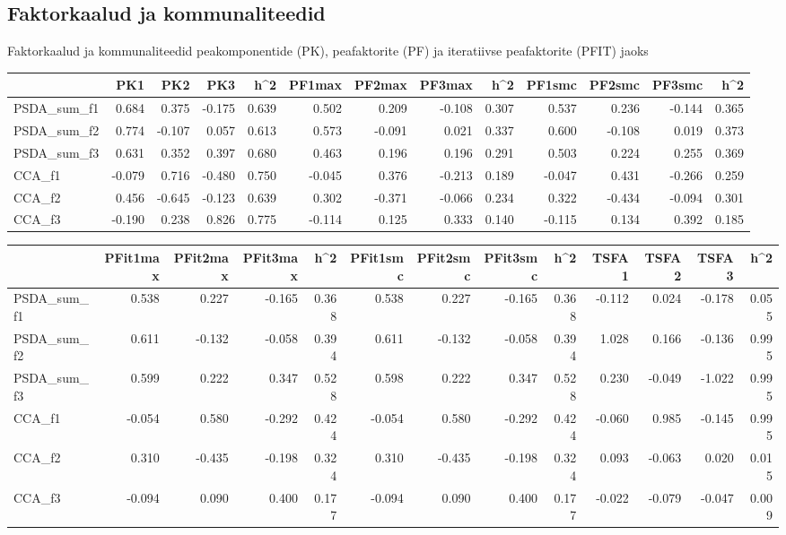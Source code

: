 \documentclass[a4paper,12pt]{report}
\begin{document}
\begin{landscape}
\chapter{Faktorkaalud ja kommunaliteedid}\label{fk}
Faktorkaalud ja kommunaliteedid peakomponentide (PK), peafaktorite (PF) ja iteratiivse peafaktorite (PFIT) jaoks

\begin{longtable}[c]{@{}lrrrrrrrrrrrr@{}}
	\toprule
	& PK1 & PK2 & PK3 & h\^{}2 & PF1max & PF2max & PF3max & h\^{}2 & PF1smc
	& PF2smc & PF3smc & h\^{}2\tabularnewline
	\midrule
	\endhead
	PSDA\_sum\_f1 & 0.684 & 0.375 & -0.175 & 0.639 & 0.502 & 0.209 & -0.108
	& 0.307 & 0.537 & 0.236 & -0.144 & 0.365\tabularnewline
	PSDA\_sum\_f2 & 0.774 & -0.107 & 0.057 & 0.613 & 0.573 & -0.091 & 0.021
	& 0.337 & 0.600 & -0.108 & 0.019 & 0.373\tabularnewline
	PSDA\_sum\_f3 & 0.631 & 0.352 & 0.397 & 0.680 & 0.463 & 0.196 & 0.196 &
	0.291 & 0.503 & 0.224 & 0.255 & 0.369\tabularnewline
	CCA\_f1 & -0.079 & 0.716 & -0.480 & 0.750 & -0.045 & 0.376 & -0.213 &
	0.189 & -0.047 & 0.431 & -0.266 & 0.259\tabularnewline
	CCA\_f2 & 0.456 & -0.645 & -0.123 & 0.639 & 0.302 & -0.371 & -0.066 &
	0.234 & 0.322 & -0.434 & -0.094 & 0.301\tabularnewline
	CCA\_f3 & -0.190 & 0.238 & 0.826 & 0.775 & -0.114 & 0.125 & 0.333 &
	0.140 & -0.115 & 0.134 & 0.392 & 0.185\tabularnewline
	\bottomrule
\end{longtable}

\begin{longtable}[c]{@{}lrrrrrrrrrrrr@{}}
	\toprule
	& PFit1max & PFit2max & PFit3max & h\^{}2 & PFit1smc & PFit2smc &
	PFit3smc & h\^{}2 & TSFA1 & TSFA2 & TSFA3 & h\^{}2\tabularnewline
	\midrule
	\endhead
	PSDA\_sum\_f1 & 0.538 & 0.227 & -0.165 & 0.368 & 0.538 & 0.227 & -0.165
	& 0.368 & -0.112 & 0.024 & -0.178 & 0.055\tabularnewline
	PSDA\_sum\_f2 & 0.611 & -0.132 & -0.058 & 0.394 & 0.611 & -0.132 &
	-0.058 & 0.394 & 1.028 & 0.166 & -0.136 & 0.995\tabularnewline
	PSDA\_sum\_f3 & 0.599 & 0.222 & 0.347 & 0.528 & 0.598 & 0.222 & 0.347 &
	0.528 & 0.230 & -0.049 & -1.022 & 0.995\tabularnewline
	CCA\_f1 & -0.054 & 0.580 & -0.292 & 0.424 & -0.054 & 0.580 & -0.292 &
	0.424 & -0.060 & 0.985 & -0.145 & 0.995\tabularnewline
	CCA\_f2 & 0.310 & -0.435 & -0.198 & 0.324 & 0.310 & -0.435 & -0.198 &
	0.324 & 0.093 & -0.063 & 0.020 & 0.015\tabularnewline
	CCA\_f3 & -0.094 & 0.090 & 0.400 & 0.177 & -0.094 & 0.090 & 0.400 &
	0.177 & -0.022 & -0.079 & -0.047 & 0.009\tabularnewline
	\bottomrule
\end{longtable}
\end{landscape}
\end{document}
